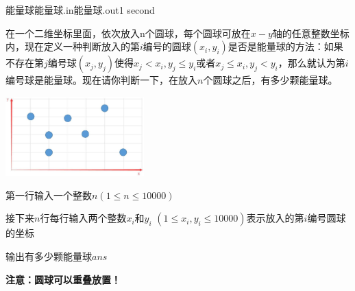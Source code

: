 \begin{problem}{能量球}{能量球.in}{能量球.out}{1 second}

在一个二维坐标里面，依次放入n个圆球，每个圆球可放在$x-y$轴的任意整数坐标内，现在定义一种判断放入的第$i$编号的圆球$(x_i,y_i)$是否是能量球的方法：如果不存在第$j$编号球$(x_j,y_j)$使得$x_j<x_i,y_j \leq y_i$或者$x_j \leq x_i,y_j<y_i$，那么就认为第$i$编号球是能量球。现在请你判断一下，在放入$n$个圆球之后，有多少颗能量球。
\begin{center}
\includegraphics[width=0.4\textwidth]{pics/B.jpg}
\end{center}
\InputFile

第一行输入一个整数$n(1 \leq n \leq 10000)$

接下来$n$行每行输入两个整数$x_i$和$y_i$ $(1 \leq x_i,y_i \leq 10000)$表示放入的第$i$编号圆球的坐标

\OutputFile

输出有多少颗能量球$ans$

\Examples

\begin{example}
%
%
\end{example}
\textbf{注意：圆球可以重叠放置！}
\end{problem}
